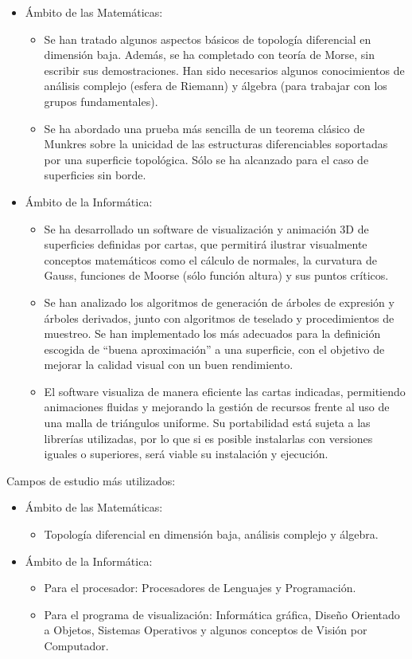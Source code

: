 \begin{itemize}
	\item Ámbito de las Matemáticas:
	\begin{itemize}
		\item Se han tratado algunos aspectos básicos de topología diferencial en dimensión baja. Además, se ha completado con teoría de Morse, sin escribir sus demostraciones. Han sido necesarios algunos conocimientos de análisis complejo (esfera de Riemann) y álgebra (para trabajar con los grupos fundamentales).
		\item Se ha abordado una prueba más sencilla de un teorema clásico de Munkres sobre la unicidad de las estructuras diferenciables soportadas por una superficie topológica. Sólo se ha alcanzado para el caso de superficies sin borde.
	\end{itemize}
	\item Ámbito de la Informática:
	\begin{itemize}
		\item Se ha desarrollado un software de visualización y animación $3$D de superficies definidas por cartas, que permitirá ilustrar visualmente conceptos matemáticos como el cálculo de normales, la curvatura de Gauss, funciones de Moorse (sólo función altura) y sus puntos críticos.
		\item Se han analizado los algoritmos de generación de árboles de expresión y árboles derivados, junto con algoritmos de teselado y procedimientos de muestreo. Se han implementado los más adecuados para la definición escogida de ``buena aproximación'' a una superficie, con el objetivo de mejorar la calidad visual con un buen rendimiento.
		\item El software visualiza de manera eficiente las cartas indicadas, permitiendo animaciones fluidas y mejorando la gestión de recursos frente al uso de una malla de triángulos uniforme. Su portabilidad está sujeta a las librerías utilizadas, por lo que si es posible instalarlas con versiones iguales o superiores, será viable su instalación y ejecución.
	\end{itemize}
\end{itemize}
Campos de estudio más utilizados:
\begin{itemize}
	\item Ámbito de las Matemáticas:
	\begin{itemize}
		\item Topología diferencial en dimensión baja, análisis complejo y álgebra.
	\end{itemize}
	\item Ámbito de la Informática:
	\begin{itemize}
		\item Para el procesador: Procesadores de Lenguajes y Programación.
		\item Para el programa de visualización: Informática gráfica, Diseño Orientado a Objetos, Sistemas Operativos y algunos conceptos de Visión por Computador.
	\end{itemize}
\end{itemize}

\endinput
